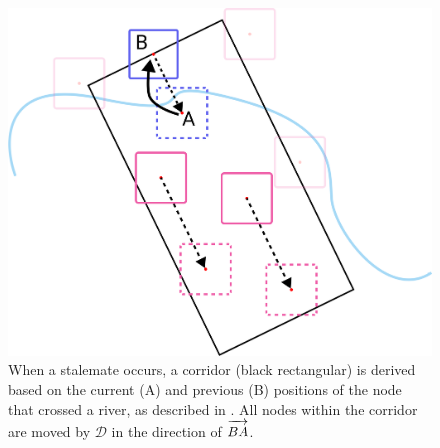 {
\begin{figure}[tb!]
    \centering
    \includegraphics[width=\columnwidth]{figure/corridor.png}
    \caption{When a stalemate occurs, a corridor (black rectangular) is derived based on the current (A) and previous (B) positions of the node that crossed a river, as described in . All nodes within the corridor are moved by $ \mathcal{D} $ in the direction of $ \protect\overrightarrow{BA\strut} $. }
    \label{fig:corridor}
\end{figure}
}


